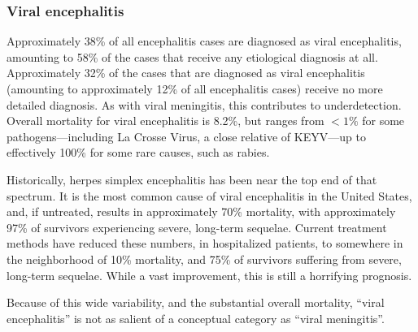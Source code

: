 \documentclass[12pt]{article}
\begin{document}
        \subsubsection{Viral encephalitis}
            \label{viral-encephalitis}
            Approximately 38\% of all encephalitis cases are diagnosed as viral encephalitis, amounting to 58\% of the cases that receive any etiological diagnosis at all. Approximately 32\% of the cases that are diagnosed as viral encephalitis (amounting to approximately 12\% of all encephalitis cases) receive no more detailed diagnosis. As with viral meningitis, this contributes to underdetection. Overall mortality for viral encephalitis is 8.2\%, but ranges from $<1\%$ for some pathogens---including La Crosse Virus, a close relative of KEYV---up to effectively 100\% for some rare causes, such as rabies\cite{george2014encephalitis}.

            Historically, herpes simplex encephalitis has been near the top end of that spectrum. It is the most common cause of viral encephalitis in the United States, and, if untreated, results in approximately 70\% mortality, with approximately 97\% of survivors experiencing severe, long-term sequelae. Current treatment methods have reduced these numbers, in hospitalized patients, to somewhere in the neighborhood of 10\% mortality, and 75\% of survivors suffering from severe, long-term sequelae\cite{bradshaw2016herpes}. While a vast improvement, this is still a horrifying prognosis.
            
            Because of this wide variability, and the substantial overall mortality, ``viral encephalitis'' is not as salient of a conceptual category as ``viral meningitis''.
\end{document}
